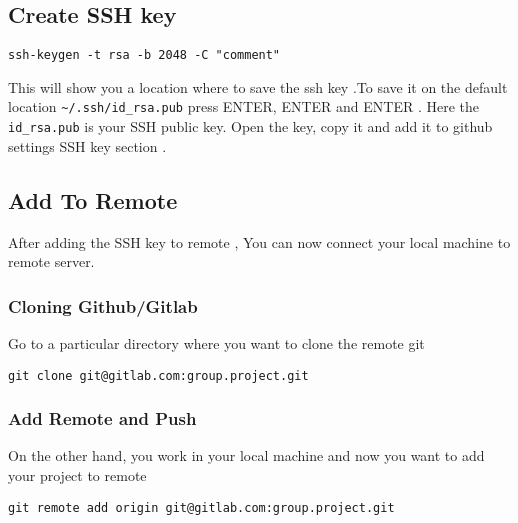 \documentclass{article}
\begin{document}
\subsection{Create SSH key}
		\begin{lstlisting}
ssh-keygen -t rsa -b 2048 -C "comment"	
		\end{lstlisting}
This will show you a location where to save the ssh key .To save it on the default location \texttt{\~{}/.ssh/id\_rsa.pub} press ENTER, ENTER and ENTER . Here the \texttt{id\_rsa.pub} is your SSH public key. Open the key, copy it and add it to github settings SSH key section . 
\subsection{Add To Remote}
After adding the SSH key to remote , You can now connect your local machine to remote server. 
\subsubsection{Cloning Github/Gitlab}
Go to a particular directory where you want to clone the remote git 
				\begin{lstlisting}
git clone git@gitlab.com:group.project.git	
				\end{lstlisting}
\subsubsection{Add Remote and Push}
On the other hand, you work in your local machine and now you want to add your project to remote
				\begin{lstlisting}
git remote add origin git@gitlab.com:group.project.git 
				\end{lstlisting}
\end{document}
